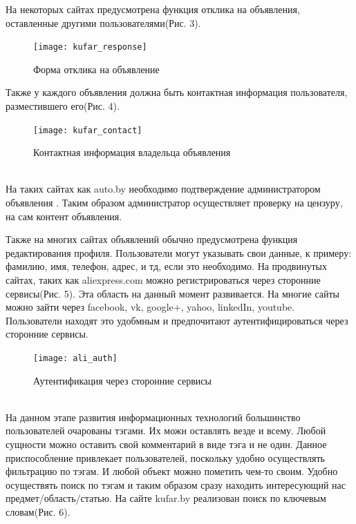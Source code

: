 \documentclass[14pt,a4paper]{extreport}
\begin{document}
 	На некоторых сайтах предусмотрена функция отклика на объявления, оставленные другими пользователями(Рис. 3).
	\begin{figure}[h]
	\begin{center}
	\texttt{[image: kufar\_response]}
	\caption{Форма отклика на объявление}
	\end{center}
	\end{figure}
		
	 Также у каждого объявления должна быть контактная информация пользователя, разместившего его(Рис. 4).
	\begin{figure}[h]
	\begin{center}
	\texttt{[image: kufar\_contact]}
	\caption{Контактная информация владельца объявления}
	\end{center}
	\end{figure}
	~\\
	 На таких сайтах как auto.by необходимо подтверждение администратором объявления . Таким образом администратор осуществляет проверку на цензуру, на сам контент объявления.\par
	Также на многих сайтах объявлений обычно предусмотрена функция редактирования профиля. Пользователи могут указывать свои данные, к примеру: фамилию, имя, телефон, адрес, и тд, если это необходимо.
	 На продвинутых сайтах, таких как aliexpress.com можно регистрироваться через сторонние сервисы(Рис. 5). Эта область на данный момент развивается. На многие сайты можно зайти через facebook, vk, google+, yahoo, linkedIn, youtube. Пользователи находят это удобмным и предпочитают аутентифицироваться через сторонние сервисы.\par
	\begin{figure}[h]
	\begin{center}
	\texttt{[image: ali\_auth]}
	\caption{Аутентификация через сторонние сервисы}
	\end{center}
	\end{figure}
	~\\
          На данном этапе развития информационных технологий большинство пользователей очарованы тэгами. Их можн оставлять везде и всему. Любой сущности можно оставить свой комментарий в виде тэга и не один. Данное приспособление привлекает пользователей, поскольку удобно осуществлять фильтрацию по тэгам. И любой объект можно пометить чем-то своим. Удобно осуществять поиск по тэгам и таким образом сразу находить интересующий нас предмет/область/статью. На сайте kufar.by реализован поиск по ключевым словам(Рис. 6).\par
\end{document}
